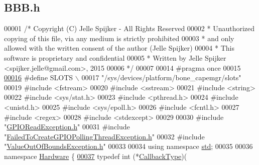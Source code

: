 \hypertarget{_b_b_b_8h_source}{}\subsection{B\+B\+B.\+h}
\label{_b_b_b_8h_source}

\begin{DoxyCode}
00001 \textcolor{comment}{/* Copyright (C) Jelle Spijker - All Rights Reserved}
00002 \textcolor{comment}{ * Unauthorized copying of this file, via any medium is strictly prohibited}
00003 \textcolor{comment}{ * and only allowed with the written consent of the author (Jelle Spijker)}
00004 \textcolor{comment}{ * This software is proprietary and confidential}
00005 \textcolor{comment}{ * Written by Jelle Spijker <spijker.jelle@gmail.com>, 2015}
00006 \textcolor{comment}{ */}
00007 
00014 \textcolor{preprocessor}{#pragma once}
00015 
\hypertarget{_b_b_b_8h_source_l00016}{}\hyperlink{_b_b_b_8h_a3de26a5dbd2276c1486afbba5fc8de59}{00016} \textcolor{preprocessor}{#define SLOTS                                                                  \(\backslash\)}
00017 \textcolor{preprocessor}{  "/sys/devices/platform/bone\_capemgr/slots" }
00019 \textcolor{preprocessor}{#include <fstream>}
00020 \textcolor{preprocessor}{#include <sstream>}
00021 \textcolor{preprocessor}{#include <string>}
00022 \textcolor{preprocessor}{#include <sys/stat.h>}
00023 \textcolor{preprocessor}{#include <pthread.h>}
00024 \textcolor{preprocessor}{#include <unistd.h>}
00025 \textcolor{preprocessor}{#include <sys/epoll.h>}
00026 \textcolor{preprocessor}{#include <fcntl.h>}
00027 \textcolor{preprocessor}{#include <regex>}
00028 \textcolor{preprocessor}{#include <stdexcept>}
00029 
00030 \textcolor{preprocessor}{#include "\hyperlink{_g_p_i_o_read_exception_8h}{GPIOReadException.h}"}
00031 \textcolor{preprocessor}{#include "\hyperlink{_failed_to_create_g_p_i_o_polling_thread_exception_8h}{FailedToCreateGPIOPollingThreadException.h}"}
00032 \textcolor{preprocessor}{#include "\hyperlink{_value_out_of_bounds_exception_8h}{ValueOutOfBoundsException.h}"}
00033 
00034 \textcolor{keyword}{using namespace }\hyperlink{namespacestd}{std};
00035 
00036 \textcolor{keyword}{namespace }\hyperlink{namespace_hardware}{Hardware} \{
\hypertarget{_b_b_b_8h_source_l00037}{}\hyperlink{namespace_hardware_a5ba2e4bdfa2bbd8b551b1d5b2a0c61fd}{00037} \textcolor{keyword}{typedef} int (*\hyperlink{namespace_hardware_a5ba2e4bdfa2bbd8b551b1d5b2a0c61fd}{CallbackType})(

\end{DoxyCode}
